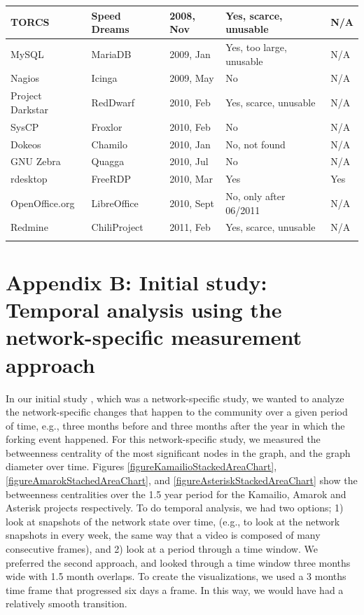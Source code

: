 \documentclass[12pt,letterpaper]{gthesis2}  %
\begin{document}
\begin{appendices}
\begin{table} [H]
\begin{tabular}{m{} m{} m{} m{} m{}}
TORCS & Speed Dreams & 2008, Nov & Yes, scarce, unusable & N/A \\ \hline
MySQL & MariaDB & 2009, Jan & Yes, too large, unusable & N/A\\ \hline
Nagios & Icinga & 2009, May & No & N/A \\ \hline
Project Darkstar& RedDwarf & 2010, Feb & Yes, scarce, unusable & N/A \\ \hline
SysCP & Froxlor & 2010, Feb & No & N/A \\ \hline
Dokeos & Chamilo & 2010, Jan & No, not found & N/A \\ \hline
GNU Zebra & Quagga & 2010, Jul & No & N/A \\ \hline
rdesktop & FreeRDP & 2010, Mar & Yes & Yes \\ \hline
OpenOffice.org & LibreOffice & 2010, Sept & No, only after 06/2011 & N/A \\ \hline
Redmine & ChiliProject & 2011, Feb & Yes, scarce, unusable & N/A \\
\noalign{\smallskip}\hline
\end{tabular}
\end{table}

\pagebreak


\section{Appendix B: Initial study: Temporal analysis using the network-specific measurement approach}
\label{sectionInitialStudy}
In our initial study \cite{AzarbakhtOpenSym2013}\cite{AzarbakhtOSS2013}\cite{AzarbakhtVLHCC2014}, which was a network-specific study, we wanted to analyze the network-specific changes that happen to the community over a given period of time, e.g., three months before and three months after the year in which the forking event happened. For this network-specific study, we measured the betweenness centrality \cite{Brandes} of the most significant nodes in the graph, and the graph diameter over time. Figures \ref{figureKamailioStackedAreaChart}, \ref{figureAmarokStachedAreaChart}, and \ref{figureAsteriskStackedAreaChart} show the betweenness centralities over the 1.5 year period for the Kamailio, Amarok and Asterisk projects respectively. To do temporal analysis, we had two options; 1) look at snapshots of the network state over time, (e.g., to look at the network snapshots in every week, the same way that a video is composed of many consecutive frames), and 2) look at a period through a time window. We preferred the second approach, and looked through a time window three months wide with 1.5 month overlaps. To create the visualizations, we used a 3 months time frame that progressed six days a frame. In this way, we would have had a relatively smooth transition.


\end{appendices}
\end{document}
